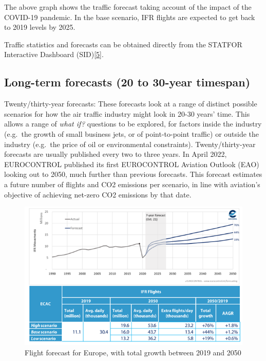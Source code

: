 \documentclass[
  11pt,
  a4paper,
]{book}
\begin{document}
The above graph shows the traffic forecast taking account of the impact
of the COVID-19 pandemic. In the base scenario, IFR flights are expected
to get back to 2019 levels by 2025.

Traffic statistics and forecasts can be obtained directly from the
STATFOR Interactive Dashboard
(SID)\protect\hyperlink{ref-ectrl:statfor:sid}{{[}5{]}}.

\hypertarget{long-term-forecasts-20-to-30-year-timespan}{%
\subsection{Long-term forecasts (20 to 30-year
timespan)}\label{long-term-forecasts-20-to-30-year-timespan}}

Twenty/thirty-year forecasts: These forecasts look at a range of
distinct possible scenarios for how the air traffic industry might look
in 20-30 years' time. This allows a range of \emph{what if?} questions
to be explored, for factors inside the industry (e.g.~the growth of
small business jets, or of point-to-point traffic) or outside the
industry (e.g.~the price of oil or environmental constraints).
Twenty/thirty-year forecasts are usually published every two to three
years. In April 2022, EUROCONTROL published its first EUROCONTROL
Aviation Outlook (EAO) looking out to 2050, much further than previous
forecasts. This forecast estimates a future number of flights and CO2
emissions per scenario, in line with aviation's objective of achieving
net-zero CO2 emissions by that date.

\begin{figure}

{\centering \includegraphics{./figures/eao_2050_flights_base_scenario.png}

}

\caption{\label{fig-Forecast-2050-plot}Flight forecast for Europe, with
total growth between 2019 and 2050}

\end{figure}
\end{document}
